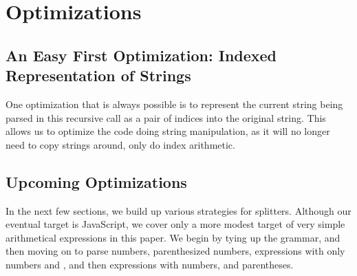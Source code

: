 \section{Optimizations}
  \subsection{An Easy First Optimization: Indexed Representation of Strings}
    One optimization that is always possible is to represent the current string being parsed in this recursive call as a pair of indices into the original string.  This allows us to optimize the code doing string manipulation, as it will no longer need to copy strings around, only do index arithmetic.
    
  \subsection{Upcoming Optimizations}
    In the next few sections, we build up various strategies for splitters.  Although our eventual target is JavaScript, we cover only a more modest target of very simple arithmetical expressions in this paper.  We begin by tying up the  grammar, and then moving on to parse numbers, parenthesized numbers, expressions with only numbers and \terminal{+}, and then expressions with numbers, \terminal{+} and parentheses. 
    
